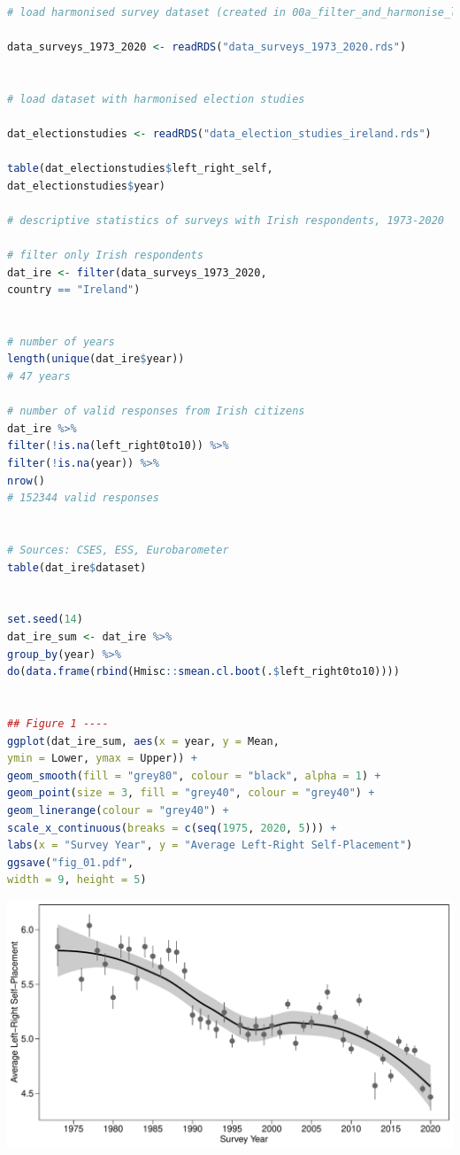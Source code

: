 \documentclass[12pt,letterpaper]{article}
\begin{document}
\begin{lstlisting}[language=R]

# load harmonised survey dataset (created in 00a_filter_and_harmonise_lr_surveys.R)

data_surveys_1973_2020 <- readRDS("data_surveys_1973_2020.rds")


# load dataset with harmonised election studies

dat_electionstudies <- readRDS("data_election_studies_ireland.rds")

table(dat_electionstudies$left_right_self,
dat_electionstudies$year)

# descriptive statistics of surveys with Irish respondents, 1973-2020

# filter only Irish respondents
dat_ire <- filter(data_surveys_1973_2020, 
country == "Ireland")


# number of years
length(unique(dat_ire$year))
# 47 years

# number of valid responses from Irish citizens
dat_ire %>% 
filter(!is.na(left_right0to10)) %>% 
filter(!is.na(year)) %>% 
nrow()
# 152344 valid responses


# Sources: CSES, ESS, Eurobarometer
table(dat_ire$dataset)


set.seed(14)
dat_ire_sum <- dat_ire %>%
group_by(year) %>%
do(data.frame(rbind(Hmisc::smean.cl.boot(.$left_right0to10))))


## Figure 1 ----
ggplot(dat_ire_sum, aes(x = year, y = Mean, 
ymin = Lower, ymax = Upper)) +
geom_smooth(fill = "grey80", colour = "black", alpha = 1) + 
geom_point(size = 3, fill = "grey40", colour = "grey40") +
geom_linerange(colour = "grey40") +
scale_x_continuous(breaks = c(seq(1975, 2020, 5))) +
labs(x = "Survey Year", y = "Average Left-Right Self-Placement")
ggsave("fig_01.pdf",
width = 9, height = 5)

 \end{lstlisting}

\includegraphics[width=1\textwidth]{fig_01}
\end{document}
